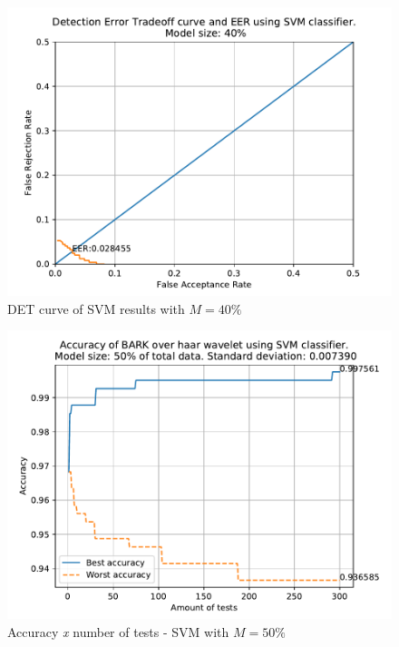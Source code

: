 	\begin{figure}[H]
		\centering
		\includegraphics[scale=.8]{images/results/det/DET_for_classifier_SVM_40.pdf}
		\caption{DET curve of SVM results with $M=40\%$}
		\label{fig:detsvm40}
	\end{figure}
	\begin{figure}[H]
		\centering
		\includegraphics[scale=.8]{images/results/confusionMatrices/classifier_SVM_50.pdf}
		\caption{Accuracy \textit{x} number of tests - SVM with $M=50\%$}
		\label{fig:classifiersvm50}
	\end{figure}
